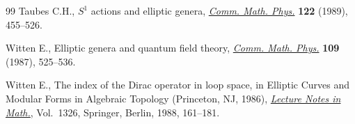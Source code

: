 \documentclass[10pt,a4paper]{amsart}
\numberwithin{equation}{section}
\begin{document}
\begin{thebibliography}{99}
Taubes C.H., {$S^1$} actions and elliptic genera, \href{https://doi.org/10.1007/BF01238437}{\textit{Comm. Math. Phys.}}
 \textbf{122} (1989), 455--526.

Witten E., Elliptic genera and quantum f\/ield theory, \href{https://doi.org/10.1007/BF01208956}{\textit{Comm. Math. Phys.}}
 \textbf{109} (1987), 525--536.

Witten E., The index of the {D}irac operator in loop space, in Elliptic Curves
 and Modular Forms in Algebraic Topology ({P}rinceton, {NJ}, 1986),
 \href{https://doi.org/10.1007/BFb0078045}{\textit{Lecture Notes in Math.}}, Vol.~1326, Springer, Berlin, 1988, 161--181.

\end{thebibliography}
\end{document}
